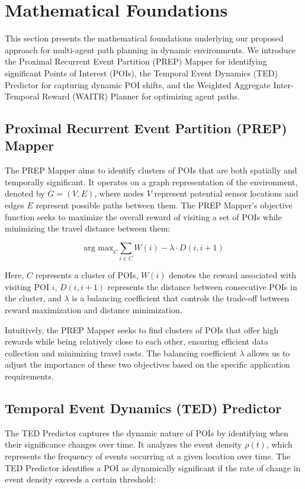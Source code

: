 \documentclass[conference]{IEEEtran}
\begin{document}
\section{Mathematical Foundations}

This section presents the mathematical foundations underlying our proposed approach for multi-agent path planning in dynamic environments. We introduce the Proximal Recurrent Event Partition (PREP) Mapper for identifying significant Points of Interest (POIs), the Temporal Event Dynamics (TED) Predictor for capturing dynamic POI shifts, and the Weighted Aggregate Inter-Temporal Reward (WAITR) Planner for optimizing agent paths.

\subsection{Proximal Recurrent Event Partition (PREP) Mapper}

The PREP Mapper aims to identify clusters of POIs that are both spatially and temporally significant. It operates on a graph representation of the environment, denoted by \(G = (V, E)\), where nodes \(V\) represent potential sensor locations and edges \(E\) represent possible paths between them. The PREP Mapper's objective function seeks to maximize the overall reward of visiting a set of POIs while minimizing the travel distance between them:

\[
\text{arg max}_{C} \sum_{i \in C} W(i) - \lambda \cdot D(i, i+1)
\]

Here, \(C\) represents a cluster of POIs, \(W(i)\) denotes the reward associated with visiting POI \(i\), \(D(i, i+1)\) represents the distance between consecutive POIs in the cluster, and \(\lambda\) is a balancing coefficient that controls the trade-off between reward maximization and distance minimization. 

Intuitively, the PREP Mapper seeks to find clusters of POIs that offer high rewards while being relatively close to each other, ensuring efficient data collection and minimizing travel costs. The balancing coefficient \(\lambda\) allows us to adjust the importance of these two objectives based on the specific application requirements.

\subsection{Temporal Event Dynamics (TED) Predictor}

The TED Predictor captures the dynamic nature of POIs by identifying when their significance changes over time. It analyzes the event density \(\rho(t)\), which represents the frequency of events occurring at a given location over time. The TED Predictor identifies a POI as dynamically significant if the rate of change in event density exceeds a certain threshold:
\end{document}
